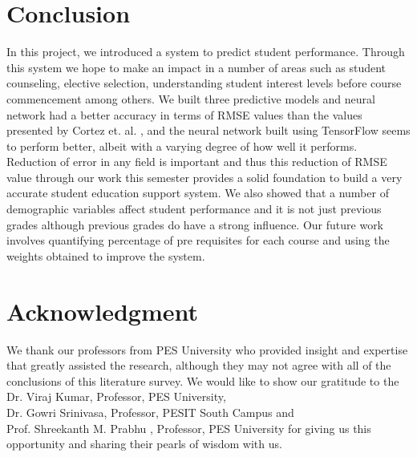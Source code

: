 \documentclass[conference]{IEEEtran}
\begin{document}
	\section{Conclusion}
In this project, we introduced a system to predict student performance. Through this system we hope to make an impact in a number of areas such as student counseling, elective selection, understanding student interest levels before course commencement among others. We built three predictive models and neural network had a better accuracy in terms of RMSE values than the values presented by Cortez et. al. \cite{ref:4}, and the neural network built using TensorFlow \cite{tensorflow2015-whitepaper} seems to perform better, albeit with a varying degree of how well it performs. Reduction of error in any field is important and thus this reduction of RMSE value through our work this semester provides a solid foundation to build a very accurate student education support system. We also showed that a number of demographic variables affect student performance and it is not just previous grades although previous grades do have a strong influence. Our future work involves quantifying percentage of pre requisites for each course and using the weights obtained to improve the system.

	\section*{Acknowledgment}
We thank our professors from PES University who provided insight and expertise that greatly assisted the research, although they may not agree with all of the conclusions of this literature survey. We would like to show our gratitude to the Dr. Viraj Kumar, Professor, PES University,\\  Dr. Gowri Srinivasa, Professor, PESIT South Campus and \\ Prof. Shreekanth M. Prabhu , Professor, PES University for giving us this opportunity and sharing their pearls of wisdom with us.

\end{document}
